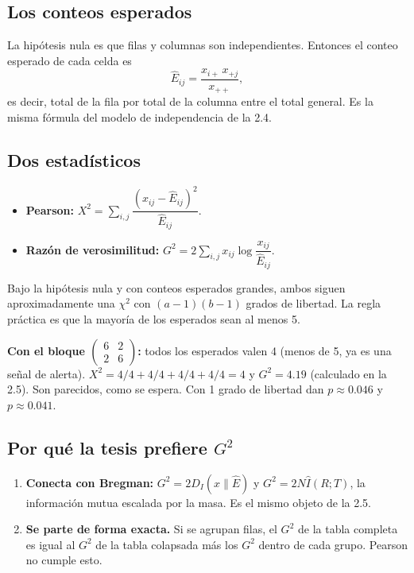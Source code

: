 \documentclass[11pt,a4paper]{article}
\begin{document}
\subsection{Los conteos esperados}

La hipótesis nula es que filas y columnas son independientes. Entonces el conteo
esperado de cada celda es
\[
  \hat E_{ij}=\frac{x_{i+}\,x_{+j}}{x_{++}},
\]
es decir, total de la fila por total de la columna entre el total general. Es la
misma fórmula del modelo de independencia de la 2.4.

\subsection{Dos estadísticos}

\begin{itemize}
  \item \textbf{Pearson:} $X^2=\sum_{i,j}\dfrac{(x_{ij}-\hat E_{ij})^2}{\hat E_{ij}}$.
  \item \textbf{Razón de verosimilitud:}
  $G^2=2\sum_{i,j}x_{ij}\log\dfrac{x_{ij}}{\hat E_{ij}}$.
\end{itemize}
Bajo la hipótesis nula y con conteos esperados grandes, ambos siguen aproximadamente
una $\chi^2$ con $(a-1)(b-1)$ grados de libertad. La regla práctica es que la
mayoría de los esperados sean al menos 5.

\textbf{Con el bloque $\begin{pmatrix}6&2\\2&6\end{pmatrix}$:} todos los esperados
valen 4 (menos de 5, ya es una señal de alerta). $X^2=4/4+4/4+4/4+4/4=4$ y
$G^2=4.19$ (calculado en la 2.5). Son parecidos, como se espera. Con 1 grado de
libertad dan $p\approx0.046$ y $p\approx0.041$.

\subsection{Por qué la tesis prefiere $G^2$}

\begin{enumerate}
  \item \textbf{Conecta con Bregman:} $G^2=2D_I(x\|\hat E)$ y
  $G^2=2N\hat I(R;T)$, la información mutua escalada por la masa. Es el mismo
  objeto de la 2.5.
  \item \textbf{Se parte de forma exacta.} Si se agrupan filas, el $G^2$ de la
  tabla completa es igual al $G^2$ de la tabla colapsada más los $G^2$ dentro de
  cada grupo. Pearson no cumple esto.
\end{enumerate}
\end{document}
